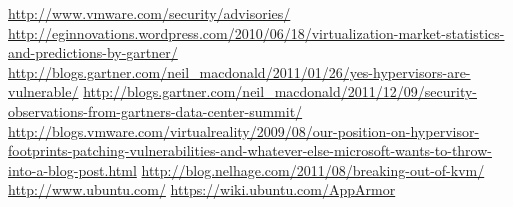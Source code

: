{}
\begin{thebibliography}{99}
 \url{http://www.vmware.com/security/advisories/}
\bibitem{} \url{http://eginnovations.wordpress.com/2010/06/18/virtualization-market-statistics-and-predictions-by-gartner/}
 \url{http://blogs.gartner.com/neil\_macdonald/2011/01/26/yes-hypervisors-are-vulnerable/}
\bibitem{}
\url{http://blogs.gartner.com/neil\_macdonald/2011/12/09/security-observations-from-gartners-data-center-summit/}
 \url{http://blogs.vmware.com/virtualreality/2009/08/our-position-on-hypervisor-footprints-patching-vulnerabilities-and-whatever-else-microsoft-wants-to-throw-into-a-blog-post.html}
 \url{http://blog.nelhage.com/2011/08/breaking-out-of-kvm/}
 \url{http://www.ubuntu.com/}
 \url{https://wiki.ubuntu.com/AppArmor}
\end{thebibliography}
